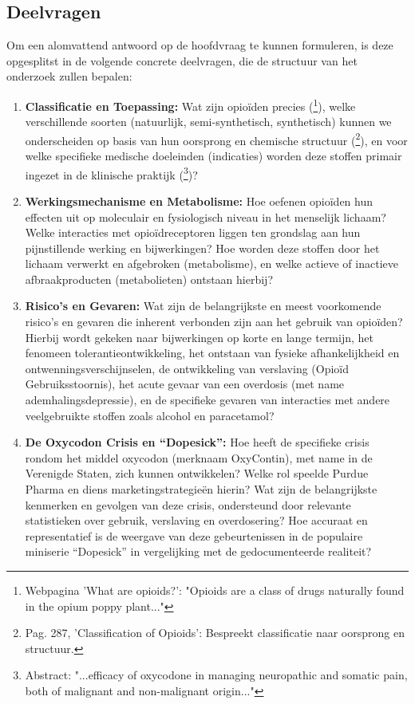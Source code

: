 \documentclass[11pt, a4paper]{report} %
\begin{document}
\subsection{Deelvragen}
Om een alomvattend antwoord op de hoofdvraag te kunnen formuleren, is deze opgesplitst in de volgende concrete deelvragen, die de structuur van het onderzoek zullen bepalen:
\begin{enumerate}
    \item \textbf{Classificatie en Toepassing:} Wat zijn opioïden precies (\cite{ClevelandClinicOpioids}\footnote{Webpagina 'What are opioids?': "Opioids are a class of drugs naturally found in the opium poppy plant..."}), welke verschillende soorten (natuurlijk, semi-synthetisch, synthetisch) kunnen we onderscheiden op basis van hun oorsprong en chemische structuur (\cite{Gupta2010ChemistryOpioids}\footnote{Pag. 287, 'Classification of Opioids': Bespreekt classificatie naar oorsprong en structuur.}), en voor welke specifieke medische doeleinden (indicaties) worden deze stoffen primair ingezet in de klinische praktijk (\cite{Riley2008OxycodoneReview}\footnote{Abstract: "...efficacy of oxycodone in managing neuropathic and somatic pain, both of malignant and non-malignant origin..."})?
    \item \textbf{Werkingsmechanisme en Metabolisme:} Hoe oefenen opioïden hun effecten uit op moleculair en fysiologisch niveau in het menselijk lichaam? Welke interacties met opioïdreceptoren liggen ten grondslag aan hun pijnstillende werking en bijwerkingen? Hoe worden deze stoffen door het lichaam verwerkt en afgebroken (metabolisme), en welke actieve of inactieve afbraakproducten (metabolieten) ontstaan hierbij?
    \item \textbf{Risico's en Gevaren:} Wat zijn de belangrijkste en meest voorkomende risico's en gevaren die inherent verbonden zijn aan het gebruik van opioïden? Hierbij wordt gekeken naar bijwerkingen op korte en lange termijn, het fenomeen tolerantieontwikkeling, het ontstaan van fysieke afhankelijkheid en ontwenningsverschijnselen, de ontwikkeling van verslaving (Opioïd Gebruiksstoornis), het acute gevaar van een overdosis (met name ademhalingsdepressie), en de specifieke gevaren van interacties met andere veelgebruikte stoffen zoals alcohol en paracetamol?
    \item \textbf{De Oxycodon Crisis en \enquote{Dopesick}:} Hoe heeft de specifieke crisis rondom het middel oxycodon (merknaam OxyContin), met name in de Verenigde Staten, zich kunnen ontwikkelen? Welke rol speelde Purdue Pharma en diens marketingstrategieën hierin? Wat zijn de belangrijkste kenmerken en gevolgen van deze crisis, ondersteund door relevante statistieken over gebruik, verslaving en overdosering? Hoe accuraat en representatief is de weergave van deze gebeurtenissen in de populaire miniserie \enquote{Dopesick} in vergelijking met de gedocumenteerde realiteit?

\end{enumerate}
\end{document}
